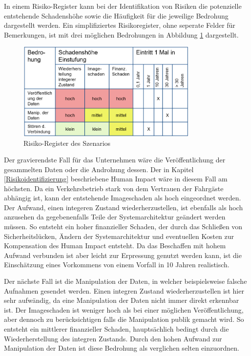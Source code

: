 In einem \glqq{}Risiko-Register\grqq{} kann bei der Identifikation von Risiken die potenzielle entstehende Schadenshöhe sowie die Häufigkeit für die jeweilige Bedrohung dargestellt werden\cite{Königs2017}.
Ein simplifiziertes Risikoregister, ohne seperate Felder für Bemerkungen, ist mit drei möglichen Bedrohungen in Abbildung \ref{fig:riskreg} dargestellt.

\begin{figure}[ht]
      \begin{center}
            \includegraphics[width= 0.8\textwidth]{Bilder/risikoregister.png}
            \caption{Risiko-Register des Szenarios}
            \label{fig:riskreg}
      \end{center}
\end{figure}


Der gravierendste Fall für das Unternehmen wäre die Veröffentlichung der gesammelten Daten oder die Androhung dessen. Der in Kapitel \ref{Risikoidentifizierung} beschriebene \glqq{}Human Impact\grqq{} wäre
in diesem Fall am höchsten. Da ein Verkehrsbetrieb stark von dem Vertrauen der Fahrgäste abhängig ist, kann der entstehende Imageschaden als hoch eingeordnet werden. Der Aufwand, einen
integeren Zustand wiederherzustellen, ist ebenfalls als hoch anzusehen da gegebenenfalls Teile der Systemarchitektur geändert werden müssen. So entsteht ein hoher finanzieller Schaden, der durch das Schließen
von Sicherheitslücken, Ändern der Systemarchitektur und eventuellen Kosten zur Kompensation des Human Impact entsteht. Da das Beschaffen mit hohem Aufwand verbunden ist aber leicht zur Erpressung genutzt werden kann,
ist die Einschätzung eines Vorkommens von einem Vorfall in 10 Jahren realistisch.


Der nächste Fall ist die Manipulation der Daten, in welcher beispielsweise falsche Aufnahmen gesendet werden. Einen integren Zustand wiederherzustellen ist hier sehr aufwändig, da eine Manipulation der Daten
nicht immer direkt erkennbar ist. Der Imageschaden ist weniger hoch als bei einer möglichen Veröffentlichung, aber dennoch zu berücksichtigen falls die Manipulation publik gemacht wird. So entsteht ein mittlerer
finanzieller Schaden, hauptsächlich bedingt durch die Wiederherstellung des integren Zustands. Durch den hohen Aufwand zur Manipulation der Daten ist diese Bedrohung als verglichen selten einzuordnen.


